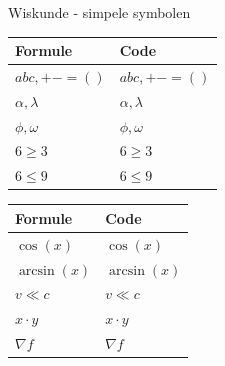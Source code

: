 
\def\extraslistsep{\hspace{0.5em}\textcolor{red!80!black}{\vrule width 1pt height 0.6\baselineskip\relax}\hspace{0.5em}}
\def\es#1{\adjustbox{scale=0.8}{#1}}

\begin{frame}[fragile,t]{Wiskunde - simpele symbolen}
	\renewcommand{\arraystretch}{1.5}%
	\begin{tabularx}{0.5\textwidth}{ll}
		\toprule
		Formule & Code\\
		\midrule
		$ abc, +- = () $ & \texttt{$ abc, + - = ( ) $}\\
		$ \alpha, \lambda $ & \texttt{$ \alpha, \lambda $} \\
		$ \phi, \omega $ & \texttt{$ \phi, \omega $} \\
		$ 6\geq 3 $ & \texttt{$ 6 \geq 3 $} \\
		$ 6 \leq 9 $  & \texttt{$ 6 \leq 9 $} \\
		\bottomrule
	\end{tabularx}%
	\begin{tabularx}{0.5\textwidth}{ll}
		\toprule
		Formule & Code\\
		\midrule
		$ \cos(x) $  & \texttt{$ \cos(x) $}\\
		$ \arcsin(x) $ & \texttt{$ \arcsin(x) $}\\
		$ v \ll c $  & \texttt{$ v \ll c $}\\
		$ x \cdot y $ & \texttt{$ x \cdot y $} \\
		$ \nabla f $ & \texttt{$ \nabla f $} \\
		\bottomrule
	\end{tabularx}%
	\par{}
\end{frame}